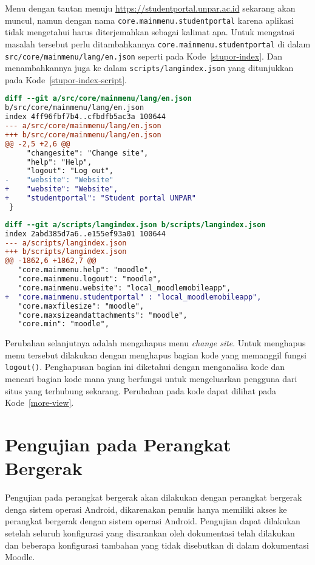 Menu dengan tautan menuju \url{https://studentportal.unpar.ac.id} sekarang akan muncul, namun dengan nama \texttt{core.mainmenu.studentportal} karena aplikasi tidak mengetahui harus diterjemahkan sebagai kalimat apa. Untuk mengatasi masalah tersebut perlu ditambahkannya \texttt{core.mainmenu.studentportal} di dalam \texttt{src/core/mainmenu/lang/en.json} seperti pada \mbox{Kode \ref{stupor-index}}. Dan menambahkannya juga ke dalam \texttt{scripts/langindex.json} yang ditunjukkan pada  \mbox{Kode \ref{stupor-index-script}}.

\begin{lstlisting}[language=diff, frame=single, label ={stupor-index}, caption = Menambahkan \texttt{core.mainmenu.studentportal} pada file  \texttt{src/core/mainmenu/lang/en.json} ]
diff --git a/src/core/mainmenu/lang/en.json 
b/src/core/mainmenu/lang/en.json
index 4ff96fbf7b4..cfbdfb5ac3a 100644
--- a/src/core/mainmenu/lang/en.json
+++ b/src/core/mainmenu/lang/en.json
@@ -2,5 +2,6 @@
     "changesite": "Change site",
     "help": "Help",
     "logout": "Log out",
-    "website": "Website"
+    "website": "Website", 
+    "studentportal": "Student portal UNPAR"
 }
\end{lstlisting} 

\begin{lstlisting}[language=diff, frame=single, label ={stupor-index-script}, caption = Menambahkan \texttt{core.mainmenu.studentportal} pada file  \texttt{scripts/langindex.json} ]
diff --git a/scripts/langindex.json b/scripts/langindex.json
index 2abd385d7a6..e155ef93a01 100644
--- a/scripts/langindex.json
+++ b/scripts/langindex.json
@@ -1862,6 +1862,7 @@
   "core.mainmenu.help": "moodle",
   "core.mainmenu.logout": "moodle",
   "core.mainmenu.website": "local_moodlemobileapp",
+  "core.mainmenu.studentportal" : "local_moodlemobileapp",
   "core.maxfilesize": "moodle",
   "core.maxsizeandattachments": "moodle",
   "core.min": "moodle",
\end{lstlisting} 

Perubahan selanjutnya adalah mengahapus menu \textit{change site}. Untuk menghapus menu tersebut dilakukan dengan menghapus bagian kode yang memanggil fungsi \texttt{logout()}. Penghapusan bagian ini diketahui dengan menganalisa kode dan mencari bagian kode mana yang berfungsi untuk mengeluarkan pengguna dari situs yang terhubung sekarang. Perubahan pada kode dapat dilihat pada \mbox{Kode \ref{more-view}}.

\section{Pengujian pada Perangkat Bergerak}
Pengujian pada perangkat bergerak akan dilakukan dengan perangkat bergerak denga sistem operasi Android, dikarenakan penulis hanya memiliki akses ke perangkat bergerak dengan sistem operasi Android. Pengujian dapat dilakukan setelah seluruh konfigurasi yang disarankan oleh dokumentasi telah dilakukan dan beberapa konfigurasi tambahan yang tidak disebutkan di dalam dokumentasi Moodle.

